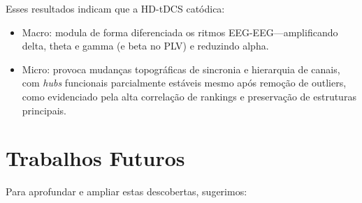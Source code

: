 Esses resultados indicam que a HD-tDCS catódica:
\begin{itemize}
  \item Macro: modula de forma diferenciada os ritmos EEG-EEG—amplificando delta, theta e gamma (e beta no PLV) e reduzindo alpha.
  \item Micro: provoca mudanças topográficas de sincronia e hierarquia de canais, com \textit{hubs} funcionais parcialmente estáveis mesmo após remoção de outliers, como evidenciado pela alta correlação de rankings e preservação de estruturas principais.
\end{itemize}

\section{Trabalhos Futuros}
Para aprofundar e ampliar estas descobertas, sugerimos:
